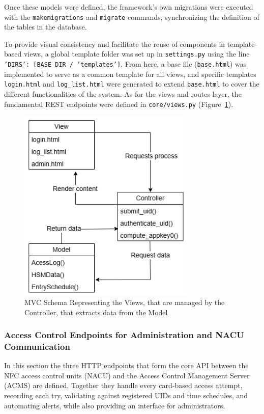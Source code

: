 Once these models were defined, the framework's own migrations were executed with the \texttt{makemigrations} and \texttt{migrate} commands, synchronizing the definition of the tables in the database.

To provide visual consistency and facilitate the reuse of components in template-based views, a global template folder was set up in \texttt{settings.py} using the line \texttt{'DIRS': [BASE\_DIR / 'templates']}. From here, a base file (\texttt{base.html}) was implemented to serve as a common template for all views, and specific templates \texttt{login.html} and \texttt{log\_list.html} were generated to extend \texttt{base.html} to cover the different functionalities of the system. As for the views and routes layer, the fundamental REST endpoints were defined in \texttt{core/views.py} (Figure~\ref{fig:mvc-schema}).

\begin{figure}[H]
	\centering
	\includegraphics[width=0.75\textwidth]{imaxes/MVC.png}
	\caption{MVC Schema Representing the Views, that are managed by the Controller, that extracts data from the Model}
	\label{fig:mvc-schema}
\end{figure}

\subsubsection{Access Control Endpoints for Administration and NACU Communication}

In this section the three HTTP endpoints that form the core API between the NFC access control units (NACU) and the Access Control Management Server (ACMS) are defined. Together they handle every card‐based access attempt, recording each try, validating against registered UIDs and time schedules, and automating alerts, while also providing an interface for administrators.


